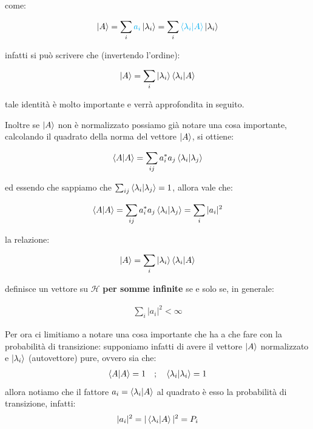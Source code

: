 	come:
	
\begin{align*}
	\ket{A} = \sum_i \textcolor{cyan}{a_i} \ket{\lambda_i} = \sum_i \textcolor{cyan}{\braket{\lambda_i}{A}} \ket{\lambda_i}
\end{align*}
	
	infatti si può scrivere che (invertendo l'ordine):

\begin{nb}
\begin{align*}
	\ket{A} = \sum_i \ket{\lambda_i} \braket{\lambda_i}{A}
\end{align*}
\end{nb}

	tale identità è molto importante e verrà approfondita in seguito. 
	
\begin{myapprf}

	Inoltre se $\ket{A}$ non è normalizzato possiamo già notare una cosa importante, calcolando il quadrato della norma del vettore $\ket{A}$, si ottiene:
	
\begin{align*}
	\braket{A} = \sum_{ij} a^*_i a_j \braket{\lambda_i}{\lambda_j}
\end{align*}

	ed essendo che sappiamo che $\sum_{ij} \braket{\lambda_i}{\lambda_j} = 1$, allora vale che:
	
\begin{align*}
	\braket{A} = \sum_{ij} a^*_i a_j \braket{\lambda_i}{\lambda_j} = \sum_i |a_i|^2
\end{align*}

	la relazione: 

\begin{align*}
	\ket{A} = \sum_i \ket{\lambda_i} \braket{\lambda_i}{A}
\end{align*}

	definisce un vettore su $\mathcal{H}$ \textbf{per somme infinite} se e solo se, in generale:

\begin{align*}
	\sum_i |a_i|^2 < \infty
\end{align*}

\end{myapprf}
	
	
	Per ora ci limitiamo a notare una cosa importante che ha a che fare con la probabilità di transizione: supponiamo infatti di avere il vettore $\ket{A}$ normalizzato e $\ket{\lambda_i}$ (autovettore) pure, ovvero sia che:
\begin{align*}
	\braket{A} = 1 \quad ; \quad \braket{\lambda_i} = 1
\end{align*}
	allora notiamo che il fattore $a_i = \braket{\lambda_i}{A}$ al quadrato è esso la probabilità di transizione, infatti:
\begin{align*}
	|a_i|^2 = |\braket{\lambda_i}{A}|^2 = P_i
\end{align*}

